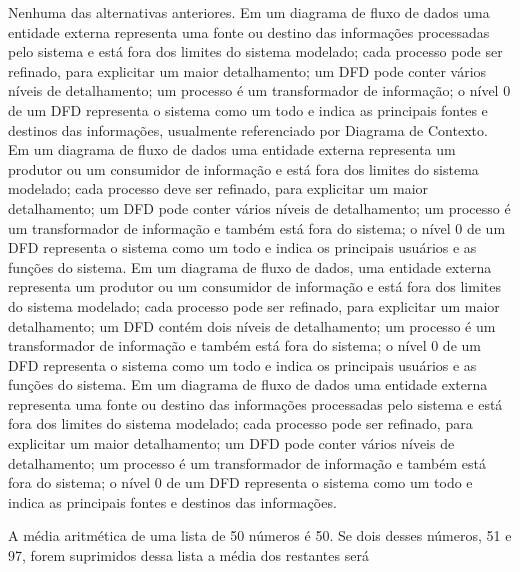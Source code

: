 \documentclass[12pt, addpoints]{exam}
\begin{document}
\begin{questions}
\begin{choices}
\choice Nenhuma das alternativas anteriores.
\choice Em um diagrama de fluxo de dados uma entidade externa representa uma fonte ou destino das informações processadas pelo sistema e está fora dos limites do sistema modelado; cada processo pode ser refinado, para explicitar um maior detalhamento; um DFD pode conter vários níveis de detalhamento; um processo é um transformador de informação; o nível 0 de um DFD representa o sistema como um todo e indica as principais fontes e destinos das informações, usualmente referenciado por Diagrama de Contexto.
\choice Em um diagrama de fluxo de dados uma entidade externa representa um produtor ou um consumidor de informação e está fora dos limites do sistema modelado; cada processo deve ser refinado, para explicitar um maior detalhamento; um DFD pode conter vários níveis de detalhamento; um processo é um transformador de informação e também está fora do sistema; o nível 0 de um DFD representa o sistema como um todo e indica os principais usuários e as funções do sistema.
\choice Em um diagrama de fluxo de dados, uma entidade externa representa um produtor ou um consumidor de informação e está fora dos limites do sistema modelado; cada processo pode ser refinado, para explicitar um maior detalhamento; um DFD contém dois níveis de detalhamento; um processo é um transformador de informação e também está fora do sistema; o nível 0 de um DFD representa o sistema como um todo e indica os principais usuários e as funções do sistema.
\choice Em um diagrama de fluxo de dados uma entidade externa representa uma fonte ou destino das informações processadas pelo sistema e está fora dos limites do sistema modelado; cada processo pode ser refinado, para explicitar um maior detalhamento; um DFD pode conter vários níveis de detalhamento; um processo é um transformador de informação e também está fora do sistema; o nível 0 de um DFD representa o sistema como um todo e indica as principais fontes e destinos das informações.
\end{choices}

\question

A média aritmética de uma lista de 50 números é 50. Se dois desses números, 51 e 97, forem suprimidos dessa lista a média dos restantes será


\begin{choices}
\end{choices}

\question


\end{questions}
\end{document}

